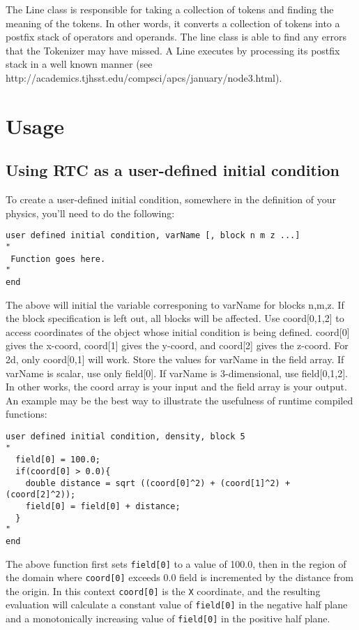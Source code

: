 \documentclass{article}
\begin{document}
\noindent
The Line class is responsible for taking a collection of tokens and finding 
the meaning of the tokens. In other words, it converts a collection of tokens
into a postfix stack of operators and operands. The line class is able to find
any errors that the Tokenizer may have missed. A Line executes by processing
its postfix stack in a well known manner 
(see http://academics.tjhsst.edu/compsci/apcs/january/node3.html). 

\section{Usage}

\subsection{Using RTC as a user-defined initial condition}

To create a user-defined initial condition, somewhere in the definition of 
your physics, you'll need to do the following:

{\ttfamily \begin{verbatim}
user defined initial condition, varName [, block n m z ...]
"
 Function goes here. 
"
end
\end{verbatim} }

\noindent
The above will initial the variable corresponing to varName for blocks n,m,z.
If the block specification is left out, all blocks will be affected. 
Use coord[0,1,2] to access coordinates of the object whose initial condition 
is being defined. coord[0] gives the x-coord, coord[1] gives the y-coord, and
coord[2] gives the z-coord. For 2d, only coord[0,1] will work. Store the 
values for varName in the field array. If varName is scalar, use only field[0].
If varName is 3-dimensional, use field[0,1,2]. In other works, the coord array 
is your input and the field array is your output.\\

\noindent
An example may be the best way to illustrate the usefulness of runtime
compiled functions:

{\ttfamily \begin{verbatim}
user defined initial condition, density, block 5
" 
  field[0] = 100.0;
  if(coord[0] > 0.0){
    double distance = sqrt ((coord[0]^2) + (coord[1]^2) + (coord[2]^2));
    field[0] = field[0] + distance;
  }
"
end
\end{verbatim} }
\noindent
The above function first sets \texttt{field[0]} to a value of 100.0, then in 
the region of the domain where \texttt{coord[0]} exceeds 0.0 field is 
incremented by the distance from the origin. In this context \texttt{coord[0]} 
is the \texttt{X} coordinate, and the resulting evaluation will calculate a
constant value of \texttt{field[0]} in the negative half plane and a
monotonically increasing value of \texttt{field[0]} in the positive half plane.\\
\end{document}
